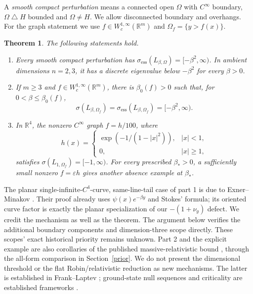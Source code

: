 \documentclass[11pt]{article}
\newtheorem{theorem}{Theorem}
\newcommand{\R}{\mathbb R}
\newcommand{\ess}{\mathrm{ess}}
\begin{document}
A \emph{smooth compact perturbation} means a connected open $\Omega$ with
$C^\infty$ boundary, $\Omega\mathbin\triangle H$ bounded and $\Omega\ne H$.
We allow disconnected boundary and overhangs. For the graph statement we use
$f\in W^{1,\infty}_c(\R^m)$ and $\Omega_f=\{y>f(x)\}$.

\begin{theorem}\label{main}
The following statements hold.
\begin{enumerate}
\item Every smooth compact perturbation has
$\sigma_\ess(L_{\beta,\Omega})=[-\beta^2,\infty)$.
In ambient dimensions $n=2,3$, it has a discrete eigenvalue below
$-\beta^2$ for every $\beta>0$.
\item If $m\ge3$ and $f\in W^{1,\infty}_c(\R^m)$, there is
$\beta_0(f)>0$ such that, for $0<\beta\le\beta_0(f)$,
\[
 \sigma(L_{\beta,\Omega_f})=
 \sigma_\ess(L_{\beta,\Omega_f})=[-\beta^2,\infty).
\]
\item In $\R^4$, the nonzero $C^\infty$ graph $f=h/100$, where
\begin{equation}\label{bump}
 h(x)=\begin{cases}\exp(-1/(1-|x|^2)),&|x|<1,\\0,&|x|\ge1,\end{cases}
\end{equation}
satisfies $\sigma(L_{1,\Omega_f})=[-1,\infty)$.
For every prescribed $\beta_*>0$, a sufficiently small nonzero
$f=\varepsilon h$ gives another absence example at $\beta_*$.
\end{enumerate}
\end{theorem}

The planar single-infinite-$C^4$-curve, same-line-tail case of part 1 is due to
Exner--Minakov \cite[Theorem 5.2]{EM}. Their proof already uses
$\psi(x)e^{-\beta y}$ and Stokes' formula; its oriented curve factor is exactly
the planar specialization of our $-(1+\nu_y)$ defect. We credit the mechanism
as well as the theorem. The argument below verifies the additional boundary
components and dimension-three scope directly. These scopes' exact historical
priority remains unknown. Part 2 and the explicit example are also corollaries
of the published massive-relativistic bound \cite[Theorem A.6]{HHRV}, through
the all-form comparison in Section~\ref{prior}. We do not present the
dimensional threshold or the flat Robin/relativistic reduction as new
mechanisms. The latter is established in Frank--Laptev \cite{FL}; ground-state
null sequences and criticality are established frameworks \cite{PV}.
\end{document}
